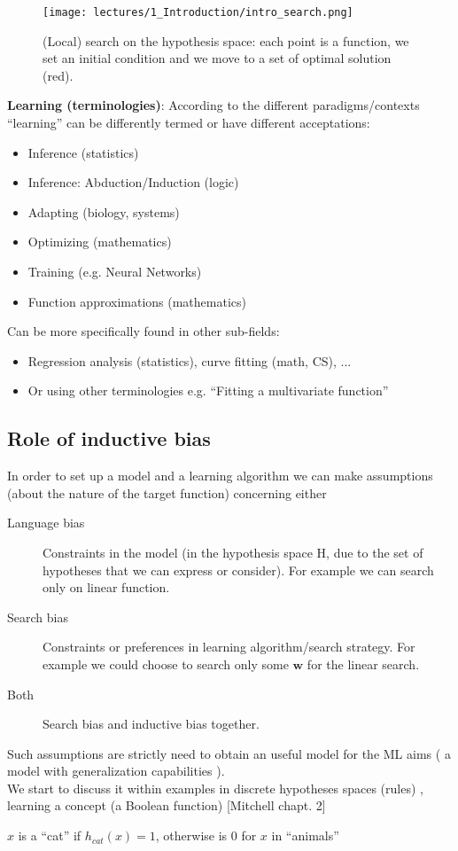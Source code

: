 \documentclass[../main.tex]{subfiles}
\begin{document}
\begin{figure}[ht]
    \centering
    \texttt{[image: lectures/1\_Introduction/intro\_search.png]}
    \caption{(Local) search on the hypothesis space: each point is a function, we set an initial condition and we move to a set of optimal solution (red).}
    \label{fig:lern_search}
\end{figure}

\noindent \textbf{Learning (terminologies)}:
According to the different paradigms/contexts “learning” can be differently termed or have different acceptations:
\begin{itemize}
    \item Inference (statistics)
    \item Inference: Abduction/Induction (logic)
    \item Adapting (biology, systems)
    \item Optimizing (mathematics)
    \item Training (e.g. Neural Networks)
    \item Function approximations (mathematics)
\end{itemize}

\noindent Can be more specifically found in other sub-fields:
\begin{itemize}
    \item Regression analysis (statistics), curve fitting (math, CS), ...
    \item Or using other terminologies e.g. “Fitting a multivariate function”
\end{itemize}

\subsection{Role of inductive bias}%
In order to set up a model and a learning algorithm we can make
assumptions (about the nature of the target function) concerning either
\begin{description}
    \item[Language bias] Constraints in the model (in the hypothesis space H, due to the set of
	hypotheses that we can express or consider). For example we can search only on linear function.
    \item[Search bias] Constraints or preferences in learning algorithm/search strategy. For example we could choose to search only some $\boldsymbol{w}$ for the linear search.
    \item[Both] Search bias and inductive bias together.
\end{description}
Such assumptions are strictly need to obtain an useful model for the ML aims ( a model with generalization capabilities ).\\
We start to discuss it within examples in discrete hypotheses spaces (rules) , learning a concept (a Boolean function) [Mitchell chapt. 2]
\begin{example}
    $x$ is a “cat” if $h_{cat}( x ) =1$, otherwise is $0$ for $x$ in “animals”
\end{example}
\end{document}
